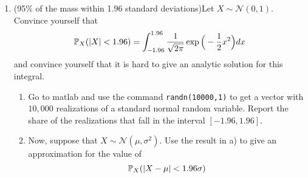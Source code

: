 \documentclass[11pt]{article} %
\begin{document}
\begin{enumerate}
\begin{enumerate}
\end{enumerate}

\item (95\% of the mass within 1.96 standard deviations)Let $X \sim \mathcal{N}(0,1)$. Convince yourself that 
$$\mathbb{P}_{X}(|X|<1.96) = \int_{-1.96}^{1.96} \frac{1}{\sqrt{2\pi}} \exp\Big( -\frac{1}{2}x^2 \Big)dx $$
\noindent and convince yourself that it is hard to give an analytic solution for this integral. 
\begin{enumerate}[a]
\item Go to matlab and use the command \texttt{randn(10000,1)} to get a vector with $10,000$ realizations of a standard normal random variable.   Report the share of the realizations that fall in the interval $[-1.96,1.96]$. 
\item Now, suppose that $X \sim \mathcal{N}(\mu,\sigma^2)$. Use the result in a) to give an approximation for the value of 
$$ \mathbb{P}_{X}(|X-\mu|< 1.96 \sigma) $$ 
\end{enumerate}

\end{enumerate}

\newpage

%
%
\end{document}
